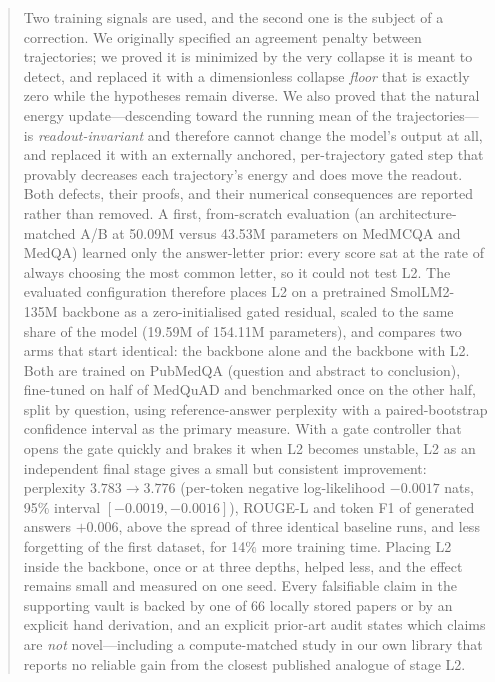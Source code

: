 \documentclass[11pt,a4paper]{article}
\theoremstyle{plain}
\theoremstyle{definition}
\theoremstyle{remark}
\begin{document}
\begin{abstract}
\noindent
Two training signals are used, and the second one is the subject of a
correction. We originally specified an agreement penalty between trajectories;
we proved it is minimized by the very collapse it is meant to detect, and
replaced it with a dimensionless collapse \emph{floor} that is exactly zero
while the hypotheses remain diverse. We also proved that the natural energy
update---descending toward the running mean of the trajectories---is
\emph{readout-invariant} and therefore cannot change the model's output at all,
and replaced it with an externally anchored, per-trajectory gated step that
provably decreases each trajectory's energy and does move the readout. Both
defects, their proofs, and their numerical consequences are reported rather
than removed. A first, from-scratch evaluation (an architecture-matched A/B
at 50.09M versus 43.53M parameters on MedMCQA and MedQA) learned only the
answer-letter prior: every score sat at the rate of always choosing the most
common letter, so it could not test L2. The evaluated configuration therefore
places L2 on a pretrained SmolLM2-135M backbone as a zero-initialised gated
residual, scaled to the same share of the model (19.59M of 154.11M
parameters), and compares two arms that start identical: the backbone alone
and the backbone with L2. Both are trained on PubMedQA (question and abstract to conclusion), fine-tuned
on half of MedQuAD and benchmarked once on the other half, split by question,
using reference-answer perplexity with a paired-bootstrap confidence interval
as the primary measure. With a gate controller that opens the gate quickly
and brakes it when L2 becomes unstable, L2 as an independent final stage gives
a small but consistent improvement: perplexity $3.783 \to 3.776$ (per-token
negative log-likelihood $-0.0017$ nats, 95\% interval $[-0.0019, -0.0016]$),
ROUGE-L and token F1 of generated answers $+0.006$, above the spread of three
identical baseline runs, and less forgetting of the first dataset, for 14\%
more training time. Placing L2 inside the backbone, once or at three depths,
helped less, and the effect remains small and measured on one seed. Every falsifiable claim in the supporting vault
is backed by one of 66 locally stored papers or by an explicit hand
derivation, and an explicit prior-art audit states which claims are \emph{not}
novel---including a compute-matched study in our own library that reports no
reliable gain from the closest published analogue of stage L2.
\end{abstract}

\clearpage
\end{document}
